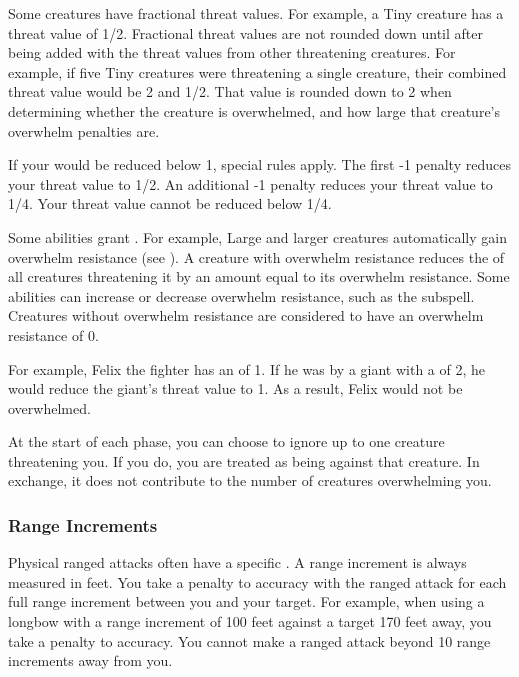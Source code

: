             Some creatures have fractional threat values.
            For example, a Tiny creature has a threat value of 1/2.
            Fractional threat values are not rounded down until after being added with the threat values from other threatening creatures.
            For example, if five Tiny creatures were threatening a single creature, their combined threat value would be 2 and 1/2.
            That value is rounded down to 2 when determining whether the creature is overwhelmed, and how large that creature's overwhelm penalties are.

            If your  would be reduced below 1, special rules apply.
            The first -1 penalty reduces your threat value to 1/2.
            An additional -1 penalty reduces your threat value to 1/4.
            Your threat value cannot be reduced below 1/4.

            \label{Overwhelm Resistance} Some abilities grant .
            For example, Large and larger creatures automatically gain overwhelm resistance (see ).
            A creature with overwhelm resistance reduces the  of all creatures threatening it by an amount equal to its overwhelm resistance.
            Some abilities can increase or decrease overwhelm resistance, such as the  subspell.
            Creatures without overwhelm resistance are considered to have an overwhelm resistance of 0.

            For example, Felix the fighter has an  of 1.
            If he was  by a giant with a  of 2, he would reduce the giant's threat value to 1.
            As a result, Felix would not be overwhelmed.

             At the start of each phase, you can choose to ignore up to one creature threatening you.
            If you do, you are treated as being \unaware against that creature.
            In exchange, it does not contribute to the number of creatures overwhelming you.

        \subsubsection{Range Increments}\label{Range Increments}
            Physical ranged attacks often have a specific .
            A range increment is always measured in feet.
            You take a  penalty to accuracy with the ranged attack for each full range increment between you and your target.
            For example, when using a longbow with a range increment of 100 feet against a target 170 feet away, you take a  penalty to accuracy.
            You cannot make a ranged attack beyond 10 range increments away from you.

